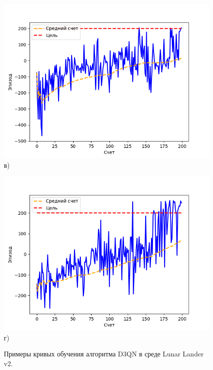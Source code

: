 \begin{figure}[ht]
\begin{minipage}[b][][b]{0.49\linewidth}
		\includegraphics[width=\linewidth]{figures/d3qn_train_score3} \\ в)
	\end{minipage}
	\hfill
	\begin{minipage}[b][][b]{0.49\linewidth}\centering
		\includegraphics[width=\linewidth]{figures/d3qn_train_score4} \\ г)
	\end{minipage}
	\caption{Примеры кривых обучения алгоритма D3QN в среде Lunar Lander v2.}
	\label{fig:trainScore}
\end{figure}

